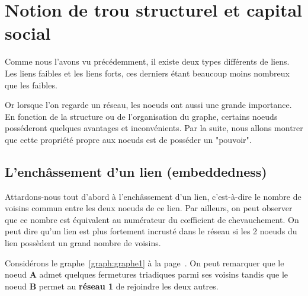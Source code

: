 \section{Notion de trou structurel et capital social}
Comme nous l'avons vu précédemment, il existe deux types différents de liens. Les liens faibles et les liens forts, ces derniers étant beaucoup moins nombreux que les faibles.

Or lorsque l'on regarde un réseau, les noeuds ont aussi une grande importance. En fonction de la structure ou de l'organisation du graphe, certains noeuds posséderont quelques avantages et inconvénients. 
Par la suite, nous allons montrer que cette propriété propre aux noeuds est de posséder un "pouvoir".

\subsection{L'enchâssement d'un lien (embeddedness)}
Attardons-nous tout d'abord à l'enchâssement d'un lien, c'est-à-dire le
nombre de voisins commun entre les deux noeuds de ce lien. Par ailleurs,
on peut observer que ce nombre est équivalent au numérateur du c\oe fficient de chevauchement.
On peut dire qu'un lien est plus fortement incrusté dans le réseau si les 2 noeuds du lien possèdent un grand nombre de voisins. 

Considérons le graphe~\ref{graph:graphe1} à la page~\pageref{graph:graphe1}. On peut remarquer que le noeud \textbf{A} admet quelques fermetures triadiques parmi ses voisins tandis que le noeud \textbf{B} permet au \textbf{réseau 1} de rejoindre les deux autres.

